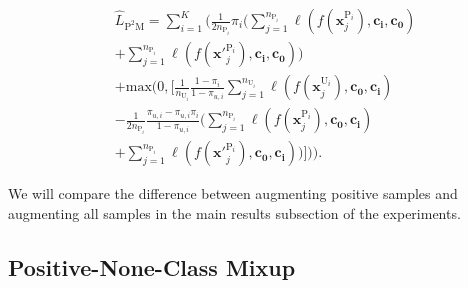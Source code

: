 \documentclass[letterpaper]{article} %
\begin{document}
\begin{equation}
\begin{aligned}\label{eq9}
&\widehat{L}_{\mathrm{P^{2}M}}=\sum_{i=1}^{K}( \frac{1}{2n_{\mathrm{P}_{i}}}\pi_{i} (\sum_{j=1}^{n_{\mathrm{P}_{i}}}\ell(f(\boldsymbol{x}_{j}^{\mathrm{P}_{i}}), \boldsymbol{c_{i}}, \boldsymbol{c_{0}}) \\&+ \sum_{j=1}^{n_{\mathrm{P}_{i}}}\ell(f(\boldsymbol{x'}_{j}^{\mathrm{P}_{i}}), \boldsymbol{c_{i}}, \boldsymbol{c_{0}})) \\&+\mathrm{max}(0, [\frac{1}{n_{\mathrm{U}_{i}}} \frac{1-\pi_{i}}{1-\pi_{u,i}} \sum_{j=1}^{n_{\mathrm{U}_{i}}} \ell(f(\boldsymbol{x}_{j}^{\mathrm{U}_{i}}), \boldsymbol{c_{0}}, \boldsymbol{c_{i}})\\&-\frac{1}{2n_{\mathrm{P}_{i}}}\frac{\pi_{u,i}-\pi_{u,i} \pi_{i}}{1-\pi_{u,i}} (\sum_{j=1}^{n_{\mathrm{P}_{i}}}\ell(f(\boldsymbol{x}_{j}^{\mathrm{P}_{i}}), \boldsymbol{c_{0}}, \boldsymbol{c_{i}}) \\&+ \sum_{j=1}^{n_{\mathrm{P}_{i}}}\ell(f(\boldsymbol{x'}_{j}^{\mathrm{P}_{i}}), \boldsymbol{c_{0}}, \boldsymbol{c_{i}}))])).
\end{aligned}
\end{equation}

We will compare the difference between augmenting positive samples and augmenting all samples in the main results subsection of the experiments.

\subsection{Positive-None-Class Mixup}
\end{document}
